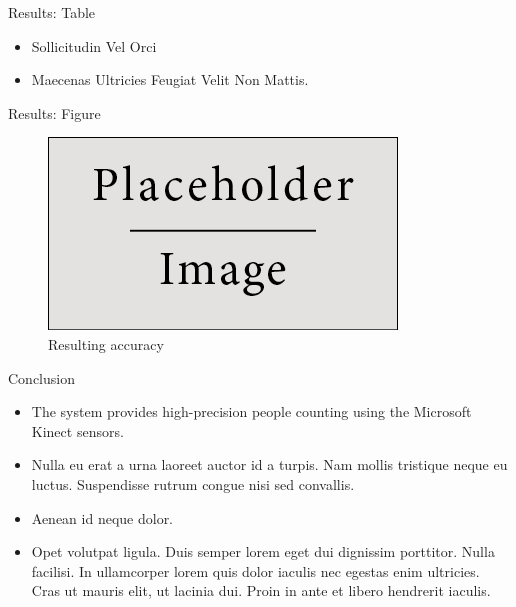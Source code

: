 \documentclass[final,hyperref={pdfpagelabels=false}]{beamer}
\begin{document}
\begin{frame}[t]
\begin{columns}[t]
\begin{column}{.465\textwidth}
\begin{block}{Results: Table}
\begin{itemize}
\item Sollicitudin Vel Orci
\item Maecenas Ultricies Feugiat Velit Non Mattis.
\end{itemize}
     
\end{block}


\begin{block}{Results: Figure}

\begin{figure}
\includegraphics[width=0.8\linewidth]{placeholder.jpg}
\caption{Resulting accuracy}
\end{figure}

\end{block}


\begin{block}{Conclusion}

\begin{itemize}
\item The system provides high-precision people counting using the Microsoft Kinect sensors.
\item Nulla eu erat a urna laoreet auctor id a turpis. Nam mollis tristique neque eu luctus. Suspendisse rutrum congue nisi sed convallis. 
\item Aenean id neque dolor.
\item Opet volutpat ligula. Duis semper lorem eget dui dignissim porttitor. Nulla facilisi. In ullamcorper lorem quis dolor iaculis nec egestas enim ultricies. Cras ut mauris elit, ut lacinia dui. Proin in ante et libero hendrerit iaculis.
\end{itemize}


\end{block}
\end{column}
\end{columns}
\end{frame}
\end{document}

